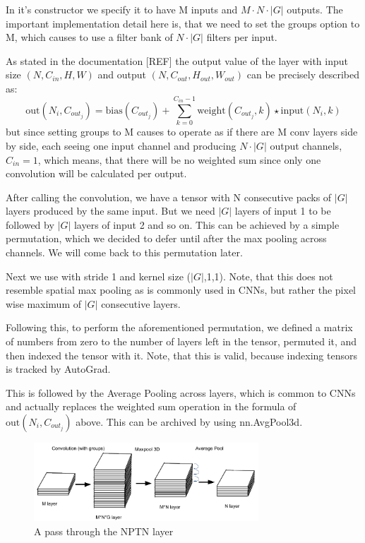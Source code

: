 \documentclass{llncs}
\begin{document}
In it's constructor we specify it to have M inputs and $M \cdot N \cdot |G|$ outputs. The important implementation detail here is, that we need to set the groups option to M, which causes \nnConvLayer to use a filter bank of $N\cdot|G|$ filters per input.

As stated in the \pytorch documentation [REF] the output value of the \nnConvLayer layer with input size $(N, C_{in}, H, W)$ and output $(N, C_{out}, H_{out}, W_{out})$ can be precisely described as:
\begin{equation*}
\text{out}(N_i, C_{out_j}) = \text{bias}(C_{out_j}) +
\sum_{k = 0}^{C_{in} - 1} \text{weight}(C_{out_j}, k) \star \text{input}(N_i, k)
\end{equation*}
but since setting groups to M causes \nnConvLayer to operate as if there are M conv layers side by side, each seeing one input channel and producing $N\cdot|G|$ output channels, $C_{in} = 1$, which means, that there will be no weighted sum since only one convolution will be calculated per output.

After calling the convolution, we have a tensor with N consecutive packs of $|G|$ layers produced by the same input. But we need $|G|$ layers of input 1 to be followed by $|G|$ layers of input 2 and so on. This can be achieved by a simple permutation, which we decided to defer until after the max pooling across channels. We will come back to this permutation later.

Next we use \nnMaxPool with stride 1 and kernel size ($|G|$,1,1). Note, that this does not resemble spatial max pooling as is commonly used in CNNs, but rather the pixel wise maximum of $|G|$ consecutive layers.

Following this, to perform the aforementioned permutation, we defined a matrix of numbers from zero to the number of layers left in the tensor, permuted it, and then indexed the tensor with it. Note, that this is valid, because indexing tensors is tracked by AutoGrad.

This is followed by the Average Pooling across layers, which is common to CNNs and actually replaces the weighted sum operation in the formula of $\text{out}(N_i, C_{out_j})$ above. This can be archived by using nn.AvgPool3d.

\begin{figure}
	\begin{center}
		\includegraphics[width=0.75\textwidth]{result_images/NptnImplementation.png}
		\caption{A pass through the NPTN layer}
		\label{fig:NptnImplementation}
	\end{center}
\end{figure}
\end{document}
